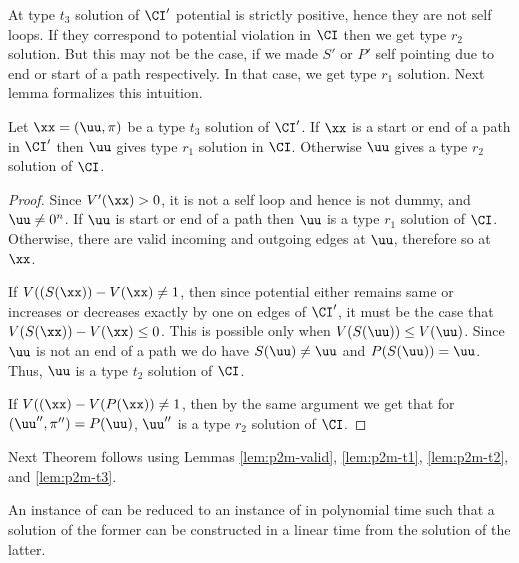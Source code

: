 At type $t_3$ solution of $\CI'$ potential is strictly positive, hence they are not self loops. If they correspond to potential violation in $\CI$ then we get type $r_2$ solution. But this may not be the case, if we made $S'$ or $P'$ self pointing due to end or start of a path respectively. In that case, we get type $r_1$ solution. Next lemma formalizes this intuition. 

\begin{lemma}\label{lem:p2m-t3}
Let $\xx=(\uu,\pi)$ be a type $t_3$ solution of $\CI'$. If $\xx$ is a start or end of a path in $\CI'$ then $\uu$ gives type $r_1$ solution in $\CI$. Otherwise $\uu$ gives a type $r_2$ solution of $\CI$.
\end{lemma}
\begin{proof}
Since $V'(\xx)>0$, it is not a self loop and hence is not dummy, and $\uu\neq 0^n$. If $\uu$ is start or end of a path then $\uu$ is a type $r_1$ solution of $\CI$. Otherwise, there are valid incoming and outgoing edges at $\uu$, therefore so at $\xx$. 

If $V((S(\xx))-V(\xx)\neq 1$, then since potential either remains same or increases or decreases exactly by one on edges of $\CI'$, it must be the case that $V(S(\xx))-V(\xx)\le 0$. This is possible only when $V(S(\uu))\le V(\uu)$. Since $\uu$ is not an end of a path we do have $S(\uu)\neq \uu$ and $P(S(\uu))=\uu$. Thus, $\uu$ is a type $t_2$ solution of $\CI$.

If $V((\xx)-V(P(\xx))\neq 1$, then by the same argument we get that for $(\uu'',\pi'')=P(\uu)$, $\uu''$ is a type $r_2$ solution of $\CI$. 
\end{proof}

Next Theorem follows using Lemmas \ref{lem:p2m-valid}, \ref{lem:p2m-t1}, \ref{lem:p2m-t2}, and \ref{lem:p2m-t3}.

\begin{theorem}\label{thm:p2m}
An instance of \EOPL can be reduced to an instance of \EOML in polynomial time such that a solution of the former can be constructed in a linear time from the solution of the latter. 
\end{theorem}

